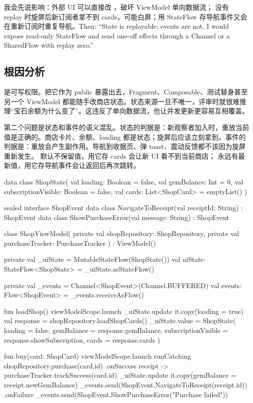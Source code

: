 \begin{sayit}[面试里怎么说]
我会先说影响：外部 UI 可以直接改 ，破坏 ViewModel 单向数据流； 没有 replay 时旋屏后新订阅者拿不到 cards，可能白屏；用 StateFlow 存导航事件又会在重新订阅时重复导航。Then: ``State is replayable; events are not. I would expose read-only StateFlow and send one-off effects through a Channel or a SharedFlow with replay zero.''
\end{sayit}

\subsection*{根因分析}
 是可写权限。把它作为 public  暴露出去，Fragment、Composable、测试替身甚至另一个 ViewModel 都能随手改商店状态。状态来源一旦不唯一，评审时就很难推理“宝石余额为什么变了”。这违反了单向数据流，也让并发更新更容易互相覆盖。

第二个问题是状态和事件的语义混乱。状态的判据是：新观察者加入时，重放当前值是正确的。商店卡片、余额、loading 都是状态；旋屏后应该立刻拿到。事件的判据是：重放会产生副作用。导航到收据页、弹 toast、震动反馈都不该因为旋屏重新发生。 默认不保留值，用它存 cards 会让新 UI 看不到当前商店； 永远有最新值，用它存导航事件会让返回后再次跳转。

\begin{ktfix}
data class ShopState(
    val loading: Boolean = false,
    val gemBalance: Int = 0,
    val subscriptionVisible: Boolean = false,
    val cards: List<ShopCard> = emptyList()
)

sealed interface ShopEvent {
    data class NavigateToReceipt(val receiptId: String) : ShopEvent
    data class ShowPurchaseError(val message: String) : ShopEvent
}

class ShopViewModel(
    private val shopRepository: ShopRepository,
    private val purchaseTracker: PurchaseTracker
) : ViewModel() {
    private val _uiState = MutableStateFlow(ShopState())
    val uiState: StateFlow<ShopState> = _uiState.asStateFlow()

    private val _events = Channel<ShopEvent>(Channel.BUFFERED)
    val events: Flow<ShopEvent> = _events.receiveAsFlow()

    fun loadShop() {
        viewModelScope.launch {
            _uiState.update { it.copy(loading = true) }
            val response = shopRepository.loadShopCards()
            _uiState.value = ShopState(
                loading = false,
                gemBalance = response.gemBalance,
                subscriptionVisible = response.showSubscription,
                cards = response.cards
            )
        }
    }

    fun buy(card: ShopCard) {
        viewModelScope.launch {
            runCatching { shopRepository.purchase(card.id) }
                .onSuccess { receipt ->
                    purchaseTracker.trackSuccess(card.id)
                    _uiState.update { it.copy(gemBalance = receipt.newGemBalance) }
                    _events.send(ShopEvent.NavigateToReceipt(receipt.id))
                }
                .onFailure { _events.send(ShopEvent.ShowPurchaseError("Purchase failed")) }
        }
    }
}
\end{ktfix}


